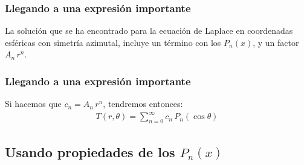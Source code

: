 \documentclass[12pt]{beamer}
\begin{document}
\begin{frame}
\frametitle{Llegando a una expresión importante}
La solución que se ha encontrado para la ecuación de Laplace en coordenadas esféricas con simetría azimutal, incluye un término con los $P_{n}(x)$, y un factor $A_{n} \, r^{n}$.
\end{frame}
\begin{frame}
\frametitle{Llegando a una expresión importante}
Si hacemos que $c_{n} = A_{n} \, r^{n}$, tendremos entonces:
\begin{align*}
T(r, \theta) = \sum_{n=0}^{\infty} c_{n} \, P_{n} (\cos \theta)
\end{align*}
\end{frame}

\subsection{Usando propiedades de los \texorpdfstring{$P_{n}(x)$}{Pn(x)}}
\end{document}
